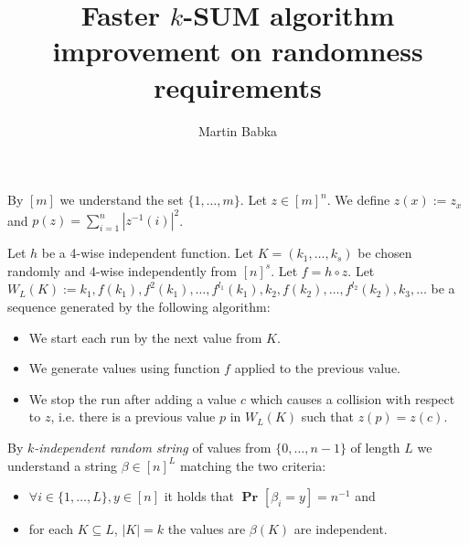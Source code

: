 \documentclass{article}
\title{Faster $k$-SUM algorithm improvement on randomness requirements}
\author{Martin Babka}
\newcommand{\probs}[2]{\operatorname{\mathbf{Pr}}_{{#1}}\left[{#2}\right]}
\newcommand{\prob}[1]{\probs{}{#1}}
\begin{document}
\maketitle

By $[m]$ we understand the set $\{1, \dots, m\}$.
Let $z \in [m]^n$. 
We define $z(x) := z_x$ and $p(z) = \sum_{i = 1}^{n} |z^{-1}(i)|^2$.

Let $h$ be a 4-wise independent function. 
Let $K = (k_1, \dots, k_s)$ be chosen randomly and 4-wise independently from $[n]^s$.
Let $f = h \circ z$.
Let $W_L(K) := k_1, f(k_1), f^2(k_1), \dots, f^{l_1}(k_1), k_2, f(k_2), \dots, f^{l_2}(k_2), k_3, \dots$ be a sequence generated by the following algorithm:
\begin{itemize}
    \item We start each run by the next value from $K$.
    \item We generate values using function $f$ applied to the previous value.
    \item We stop the run after adding a value $c$ which causes a collision with respect to $z$, i.e. there is a previous value $p$ in $W_L(K)$ such that $z(p) = z(c)$.
\end{itemize}

By \emph{$k$-independent random string} of values from $\{0, \dots, n - 1\}$ of length $L$  we understand a string $\beta \in [n]^L$ matching the two criteria: 
\begin{itemize}
    \item $\forall i \in \{1, \dots, L\}, y \in [n]$ it holds that $\prob{\beta_i = y} = n^{-1}$ and
    \item for each $K \subseteq L$, $|K| = k$ the values are $\beta(K)$ are independent.
\end{itemize}
\end{document}
